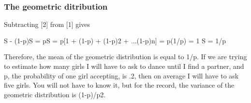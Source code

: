 \documentclass[12pt]{beamer}
\begin{document}
\begin{frame}
\frametitle{The geometric ditribution}
Subtracting [2] from [1] gives 

S - (1-p)S = pS = p[1 + (1-p) + (1-p)2 + ...(1-p)n] = p(1/p) = 1
S = 1/p 

Therefore, the mean of the geometric distribution is equal to 1/p. If we are trying to estimate how many girls I will have to ask to dance until I find a partner, and p, the probability of one girl accepting, is .2, then on average I will have to ask five girls. 
You will not have to know it, but for the record, the variance of the geometric distribution is (1-p)/p2. 
\end{frame}
\end{document}
